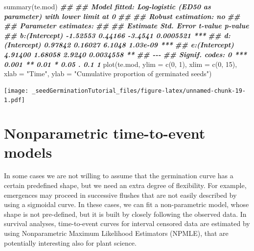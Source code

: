 \documentclass[
]{book}
\newenvironment{Shaded}{\begin{snugshade}}{\end{snugshade}}
\newcommand{\AttributeTok}[1]{\textcolor[rgb]{0.77,0.63,0.00}{#1}}
\newcommand{\DecValTok}[1]{\textcolor[rgb]{0.00,0.00,0.81}{#1}}
\newcommand{\DocumentationTok}[1]{\textcolor[rgb]{0.56,0.35,0.01}{\textbf{\textit{#1}}}}
\newcommand{\FunctionTok}[1]{\textcolor[rgb]{0.00,0.00,0.00}{#1}}
\newcommand{\NormalTok}[1]{#1}
\newcommand{\StringTok}[1]{\textcolor[rgb]{0.31,0.60,0.02}{#1}}
\begin{document}
\begin{Shaded}
\begin{Highlighting}[]
\FunctionTok{summary}\NormalTok{(te.mod)}
\DocumentationTok{\#\# }
\DocumentationTok{\#\# Model fitted: Log{-}logistic (ED50 as parameter) with lower limit at 0}
\DocumentationTok{\#\# }
\DocumentationTok{\#\# Robust estimation: no }
\DocumentationTok{\#\# }
\DocumentationTok{\#\# Parameter estimates:}
\DocumentationTok{\#\# }
\DocumentationTok{\#\#               Estimate Std. Error t{-}value   p{-}value    }
\DocumentationTok{\#\# b:(Intercept) {-}1.52553    0.44166 {-}3.4541 0.0005521 ***}
\DocumentationTok{\#\# d:(Intercept)  0.97842    0.16027  6.1048  1.03e{-}09 ***}
\DocumentationTok{\#\# e:(Intercept)  4.91400    1.68058  2.9240 0.0034558 ** }
\DocumentationTok{\#\# {-}{-}{-}}
\DocumentationTok{\#\# Signif. codes:  0 \textquotesingle{}***\textquotesingle{} 0.001 \textquotesingle{}**\textquotesingle{} 0.01 \textquotesingle{}*\textquotesingle{} 0.05 \textquotesingle{}.\textquotesingle{} 0.1 \textquotesingle{} \textquotesingle{} 1}
\FunctionTok{plot}\NormalTok{(te.mod, }\AttributeTok{ylim =} \FunctionTok{c}\NormalTok{(}\DecValTok{0}\NormalTok{, }\DecValTok{1}\NormalTok{), }\AttributeTok{xlim =} \FunctionTok{c}\NormalTok{(}\DecValTok{0}\NormalTok{, }\DecValTok{15}\NormalTok{),}
     \AttributeTok{xlab =} \StringTok{"Time"}\NormalTok{, }\AttributeTok{ylab =} \StringTok{"Cumulative proportion of germinated seeds"}\NormalTok{)}
\end{Highlighting}
\end{Shaded}

\texttt{[image: \_seedGerminationTutorial\_files/figure-latex/unnamed-chunk-19-1.pdf]}

\hypertarget{nonparametric-time-to-event-models}{%
\section{Nonparametric time-to-event models}\label{nonparametric-time-to-event-models}}

In some cases we are not willing to assume that the germination curve has a certain predefined shape, but we need an extra degree of flexibility. For example, emergences may proceed in successive flushes that are not easily described by using a sigmoidal curve. In these cases, we can fit a non-parametric model, whose shape is not pre-defined, but it is built by closely following the observed data. In survival analyses, time-to-event curves for interval censored data are estimated by using Nonparametric Maximum Likelihood Estimators (NPMLE), that are potentially interesting also for plant science.
\end{document}
